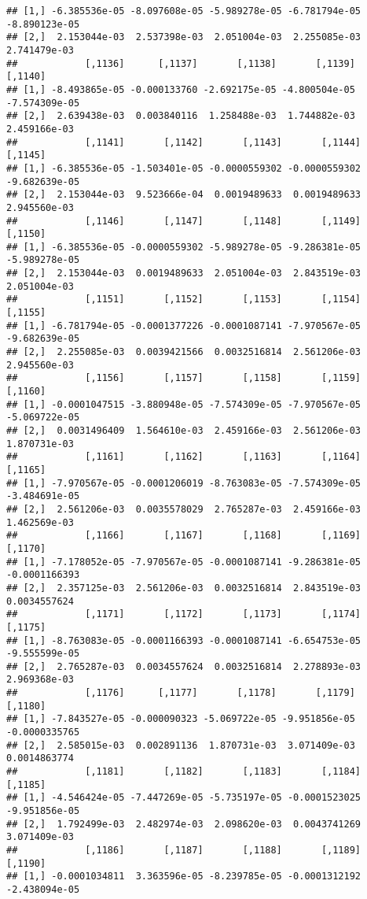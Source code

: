 \documentclass[
]{article}
\begin{document}
\begin{verbatim}
## [1,] -6.385536e-05 -8.097608e-05 -5.989278e-05 -6.781794e-05 -8.890123e-05
## [2,]  2.153044e-03  2.537398e-03  2.051004e-03  2.255085e-03  2.741479e-03
##            [,1136]      [,1137]       [,1138]       [,1139]       [,1140]
## [1,] -8.493865e-05 -0.000133760 -2.692175e-05 -4.800504e-05 -7.574309e-05
## [2,]  2.639438e-03  0.003840116  1.258488e-03  1.744882e-03  2.459166e-03
##            [,1141]       [,1142]       [,1143]       [,1144]       [,1145]
## [1,] -6.385536e-05 -1.503401e-05 -0.0000559302 -0.0000559302 -9.682639e-05
## [2,]  2.153044e-03  9.523666e-04  0.0019489633  0.0019489633  2.945560e-03
##            [,1146]       [,1147]       [,1148]       [,1149]       [,1150]
## [1,] -6.385536e-05 -0.0000559302 -5.989278e-05 -9.286381e-05 -5.989278e-05
## [2,]  2.153044e-03  0.0019489633  2.051004e-03  2.843519e-03  2.051004e-03
##            [,1151]       [,1152]       [,1153]       [,1154]       [,1155]
## [1,] -6.781794e-05 -0.0001377226 -0.0001087141 -7.970567e-05 -9.682639e-05
## [2,]  2.255085e-03  0.0039421566  0.0032516814  2.561206e-03  2.945560e-03
##            [,1156]       [,1157]       [,1158]       [,1159]       [,1160]
## [1,] -0.0001047515 -3.880948e-05 -7.574309e-05 -7.970567e-05 -5.069722e-05
## [2,]  0.0031496409  1.564610e-03  2.459166e-03  2.561206e-03  1.870731e-03
##            [,1161]       [,1162]       [,1163]       [,1164]       [,1165]
## [1,] -7.970567e-05 -0.0001206019 -8.763083e-05 -7.574309e-05 -3.484691e-05
## [2,]  2.561206e-03  0.0035578029  2.765287e-03  2.459166e-03  1.462569e-03
##            [,1166]       [,1167]       [,1168]       [,1169]       [,1170]
## [1,] -7.178052e-05 -7.970567e-05 -0.0001087141 -9.286381e-05 -0.0001166393
## [2,]  2.357125e-03  2.561206e-03  0.0032516814  2.843519e-03  0.0034557624
##            [,1171]       [,1172]       [,1173]       [,1174]       [,1175]
## [1,] -8.763083e-05 -0.0001166393 -0.0001087141 -6.654753e-05 -9.555599e-05
## [2,]  2.765287e-03  0.0034557624  0.0032516814  2.278893e-03  2.969368e-03
##            [,1176]      [,1177]       [,1178]       [,1179]       [,1180]
## [1,] -7.843527e-05 -0.000090323 -5.069722e-05 -9.951856e-05 -0.0000335765
## [2,]  2.585015e-03  0.002891136  1.870731e-03  3.071409e-03  0.0014863774
##            [,1181]       [,1182]       [,1183]       [,1184]       [,1185]
## [1,] -4.546424e-05 -7.447269e-05 -5.735197e-05 -0.0001523025 -9.951856e-05
## [2,]  1.792499e-03  2.482974e-03  2.098620e-03  0.0043741269  3.071409e-03
##            [,1186]       [,1187]       [,1188]       [,1189]       [,1190]
## [1,] -0.0001034811  3.363596e-05 -8.239785e-05 -0.0001312192 -2.438094e-05

\end{verbatim}
\end{document}

